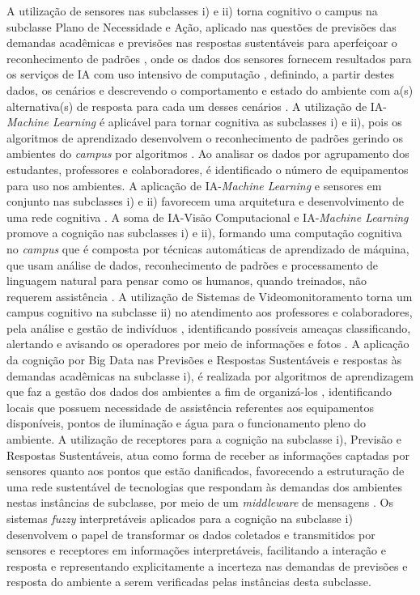 \documentclass[portuguese]{textolivre}
\begin{document}
A utilização de sensores nas subclasses i) e ii) torna cognitivo o campus na subclasse Plano de Necessidade e Ação, aplicado nas questões de previsões das demandas acadêmicas e previsões nas respostas sustentáveis para aperfeiçoar o reconhecimento de padrões \cite{vaca-cardenas2020}, onde os dados dos sensores fornecem resultados para os serviços de IA com uso intensivo de computação \cite{rausch2021}, definindo, a partir destes dados, os cenários e descrevendo o comportamento e estado do ambiente com a(s) alternativa(s) de resposta para cada um desses cenários \cite{mostashari2011}. A utilização de IA-\textit{Machine Learning} é aplicável para tornar cognitiva as subclasses i) e ii), pois os algoritmos de aprendizado desenvolvem o reconhecimento de padrões \cite{sangwan2021} gerindo os ambientes do \textit{campus} por algoritmos \cite{wang2023}. Ao analisar os dados por agrupamento dos estudantes, professores e colaboradores, é identificado o número de equipamentos para uso nos ambientes. A aplicação de IA-\textit{Machine Learning} e sensores em conjunto nas subclasses i) e ii) favorecem uma arquitetura e desenvolvimento de uma rede cognitiva \cite{daniel2021}. A soma de IA-Visão Computacional e IA-\textit{Machine Learning} promove a cognição nas subclasses i) e ii), formando uma computação cognitiva no \textit{campus} que é composta por técnicas automáticas de aprendizado de máquina, que usam análise de dados, reconhecimento de padrões e processamento de linguagem natural para pensar como os humanos, quando treinados, não requerem assistência \cite{rahman2019}. A utilização de Sistemas de Videomonitoramento torna um campus cognitivo na subclasse ii) no atendimento aos professores e colaboradores, pela análise e gestão de indivíduos \cite{baig2018cognitive}, identificando possíveis ameaças \cite{kienzle2016} classificando, alertando e avisando os operadores por meio de informações e fotos \cite{coccoli2022}. A aplicação da cognição por Big Data nas Previsões e Respostas Sustentáveis e respostas às demandas acadêmicas na subclasse i), é realizada por algoritmos de aprendizagem \cite{wang2023} que faz a gestão dos dados dos ambientes a fim de organizá-los \cite{daniel2021}, identificando locais que possuem necessidade de assistência referentes aos equipamentos disponíveis, pontos de iluminação e água para o funcionamento pleno do ambiente. A utilização de receptores para a cognição na subclasse i), Previsão e Respostas Sustentáveis, atua como forma de receber as informações captadas por sensores quanto aos pontos que estão danificados, favorecendo a estruturação de uma rede sustentável de tecnologias \cite{chapman2021} que respondam às demandas dos ambientes nestas instâncias de subclasse, por meio de um \textit{middleware} de mensagens \cite{rausch2021}. Os sistemas \textit{fuzzy} interpretáveis aplicados para a cognição na subclasse i) desenvolvem o papel de transformar os dados coletados e transmitidos por sensores e receptores em informações interpretáveis, facilitando a interação e resposta \cite{alonso2018} e representando explicitamente a incerteza \cite{donofrio2018} nas demandas de previsões e resposta do ambiente a serem verificadas pelas instâncias desta subclasse.
\end{document}
